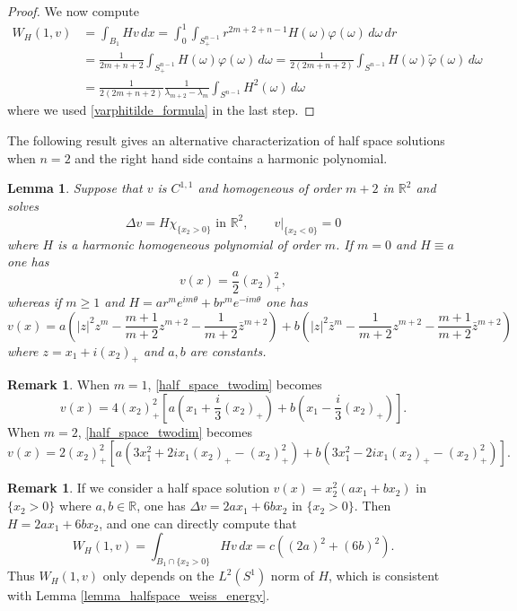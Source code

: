 \documentclass[11pt,a4paper]{amsart}
\newtheorem{Lemma}[Theorem]{Lemma}
\theoremstyle{definition}
\newtheorem{Remark}[Theorem]{Remark}
\numberwithin{equation}{section}
\newcommand{\mR}{\mathbb{R}}                    %
\newcommand{\abs}[1]{\lvert #1 \rvert}          %
\begin{document}
\begin{proof}
We now compute 
\begin{align*}
W_H(1,v) &= \int_{B_1} H v \,dx = \int_0^1 \int_{S^{n-1}_+} r^{2m+2+n-1} H(\omega) \varphi(\omega) \,d\omega \,dr \\
 &= \frac{1}{2m+n+2} \int_{S^{n-1}_+} H(\omega) \varphi(\omega) \,d\omega = \frac{1}{2(2m+n+2)} \int_{S^{n-1}} H(\omega) \tilde{\varphi}(\omega) \,d\omega \\
 &= \frac{1}{2(2m+n+2)} \frac{1}{\lambda_{m+2}-\lambda_m} \int_{S^{n-1}} H^2(\omega) \,d\omega
\end{align*}
where we used \eqref{varphitilde_formula} in the last step.
\end{proof}



The following result gives an alternative characterization of half space solutions when $n=2$ and the right hand side contains a harmonic polynomial.

\begin{Lemma} \label{lemma_half_space_twodim}
Suppose that $v$ is $C^{1,1}$ and homogeneous of order $m+2$ in $\mR^2$ and solves 
\[
\Delta v = H \chi_{\{x_2 > 0\}} \text{ in $\mR^2$}, \qquad v|_{\{x_2 < 0\}} = 0
\]
where $H$ is a harmonic homogeneous polynomial of order $m$. If $m=0$ and $H \equiv a$ one has 
\[
v(x) = \frac{a}{2} (x_2)_+^2,
\]
whereas if $m \geq 1$ and $H = a r^m e^{im\theta} + b r^m e^{-im\theta}$ one has 
\begin{equation} \label{half_space_twodim}
v(x) = a(\abs{z}^2 z^m - \frac{m+1}{m+2} z^{m+2} - \frac{1}{m+2} \bar{z}^{m+2}) + b(\abs{z}^2 \bar{z}^m - \frac{1}{m+2} z^{m+2} - \frac{m+1}{m+2} \bar{z}^{m+2})
\end{equation}
where $z = x_1 + i(x_2)_+$ and $a, b$ are constants.
\end{Lemma}

\begin{Remark}
When $m=1$, \eqref{half_space_twodim} becomes 
\[
v(x) = 4 (x_2)_+^2 \left[ a (x_1 + \frac{i}{3} (x_2)_+) +  b (x_1 - \frac{i}{3} (x_2)_+) \right].
\]
When $m=2$, \eqref{half_space_twodim} becomes 
\[
v(x) = 2 (x_2)_+^2 \left[ a (3 x_1^2 + 2i x_1 (x_2)_+ - (x_2)_+^2) +  b (3 x_1^2 - 2i x_1 (x_2)_+ - (x_2)_+^2) \right].
\]
\end{Remark}

\begin{Remark}
If we consider a half space solution $v(x) = x_2^2 (a x_1 + b x_2)$ in $\{ x_2 > 0 \}$ where $a, b \in \mR$, one has $\Delta v = 2a x_1 + 6 b x_2$ in $\{ x_2 > 0 \}$. Then $H = 2 a x_1 + 6 b x_2$, and one can directly compute that 
\[
W_H(1,v) = \int_{B_1 \cap \{ x_2 > 0 \}} H v \,dx = c((2a)^2 + (6b)^2).
\]
Thus $W_H(1,v)$ only depends on the $L^2(S^1)$ norm of $H$, which is consistent with Lemma \ref{lemma_halfspace_weiss_energy}.
\end{Remark}
\end{document}
